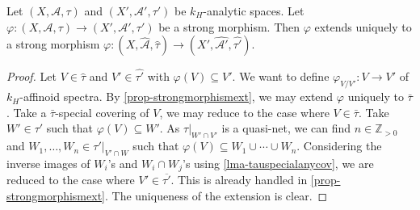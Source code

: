 \begin{lemma}\label{lma-extstrongmorphismhat}
    Let $(X,\mathcal{A},\tau)$ and $(X',\mathcal{A}',\tau')$ be $k_H$-analytic spaces. Let $\varphi:(X,\mathcal{A},\tau)\rightarrow (X',\mathcal{A}',\tau')$ be a strong morphism. Then $\varphi$ extends uniquely to a strong morphism $\varphi:(X,\hat{\mathcal{A}},\hat{\tau})\rightarrow (X',\widehat{\mathcal{A}'},\widehat{\tau'})$.
\end{lemma}
\begin{proof}
    Let $V\in \hat{\tau}$ and $V'\in \widehat{\tau'}$ with $\varphi(V)\subseteq V'$. We want to define $\varphi_{V/V'}:V\rightarrow V'$ of $k_H$-affinoid spectra. By \cref{prop-strongmorphismext}, we may extend $\varphi$ uniquely to $\bar{\tau}$. Take a $\bar{\tau}$-special covering of $V$, we may reduce to the case where $V\in\bar{\tau}$. Take $W'\in \tau'$ such that $\varphi(V)\subseteq W'$. As $\tau|_{W'\cap V'}$ is a quasi-net, we can find $n\in \mathbb{Z}_{>0}$ and $W_1,\ldots,W_n\in \tau'|_{V'\cap W}$ such that $\varphi(V)\subseteq W_1\cup \cdots\cup W_n$. Considering the inverse images of $W_i$'s and $W_i\cap W_j$'s using \cref{lma-tauspecialanycov}, we are reduced to the case where $V'\in \overline{\tau'}$. This is already handled in \cref{prop-strongmorphismext}. The uniqueness of the extension is clear.
\end{proof}

